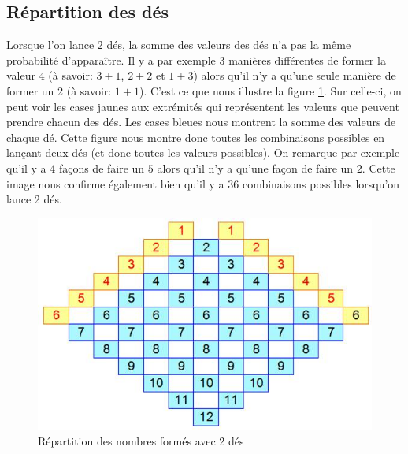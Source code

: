 \documentclass[letterpaper]{article}
\begin{document}
  \subsection{Répartition des dés}
    \label{repart_des}
    Lorsque l'on lance 2 dés, la somme des valeurs des dés n'a pas la même probabilité
    d'apparaître.  Il y a par exemple 3 manières différentes de former la valeur 4 (à
    savoir: $3+1$, $2+2$ et $1+3$) alors qu'il n'y a qu'une seule manière de former
    un 2 (à savoir: $1+1$).
    C'est ce que nous illustre la figure \ref{tableau_repartition_des}.  Sur celle-ci,
    on peut voir les cases jaunes aux extrémités qui représentent les valeurs que
    peuvent prendre chacun des dés.  Les cases bleues nous montrent la somme des valeurs
    de chaque dé.  Cette figure nous montre donc toutes les combinaisons possibles en
    lançant deux dés (et donc toutes les valeurs possibles).  On remarque par exemple
    qu'il y a 4 façons de faire un $5$ alors qu'il n'y a qu'une façon de faire un $2$.
    Cette image nous confirme également bien qu'il y a 36 combinaisons possibles
    lorsqu'on lance 2 dés.
    \begin{figure}[h]
      \centering
      \includegraphics[scale=0.4]{./Images/RepartitionDes.jpg}
	\caption{Répartition des nombres formés avec 2 dés \citep{IMG_Des}}
      \label{tableau_repartition_des}
    \end{figure}
\end{document}
